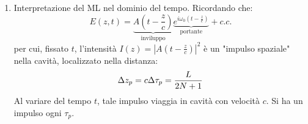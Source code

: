 \begin{enumerate}
\begin{enumerate}
\item Interpretazione del ML nel dominio del tempo.
Ricordando che:
\begin{equation*}
E(z,t) = \underbrace{A\left(t -\frac{z}{c}\right)}_\text{inviluppo} \underbrace{e^{i\omega_0 \left(t - \frac{z}{c}\right)}}_\text{portante} + c.c.
\end{equation*}
per cui, fissato $t$, l'intensità $I(z) = \left|A\left(t-\frac{z}{c}\right)\right|^2$ è un "impulso spaziale" nella cavità, localizzato nella distanza:
\begin{equation*}
\Delta z_p = c \Delta\tau_p = \frac{L}{2N+1}
\end{equation*}
Al variare del tempo $t$, tale impulso viaggia in cavità con velocità $c$.
Si ha un impulso ogni $\tau_p$.
\end{enumerate}
\end{enumerate}

